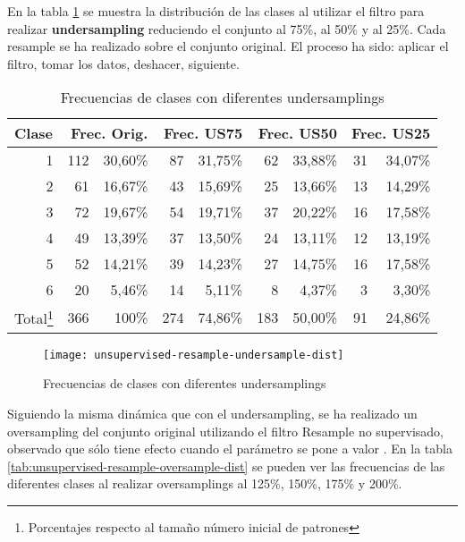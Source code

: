 En la tabla \ref{tab:unsupervised-resample-undersample-dist} se muestra la distribución de las clases al utilizar el filtro para realizar \textbf{undersampling} reduciendo el conjunto al 75\%, al 50\% y al 25\%. Cada resample se ha realizado sobre el conjunto original. El proceso ha sido: aplicar el filtro, tomar los datos, deshacer, siguiente.
\begin{table}[ht]
    \centering
    \begin{tabular}{|r|rr|rr|rr|rr|}
        \hline
        \multicolumn{1}{|l|}{Clase} & \multicolumn{2}{r|}{Frec. Orig.} & \multicolumn{2}{r|}{Frec. US75} & \multicolumn{2}{r|}{Frec. US50} & \multicolumn{2}{r|}{Frec. US25} \\ 
        \hline
        1 & 112 & 30,60\% & 87 & 31,75\% & 62 & 33,88\% & 31 & 34,07\% \\
        2 & 61  & 16,67\% & 43 & 15,69\% & 25 & 13,66\% & 13 & 14,29\% \\
        3 & 72  & 19,67\% & 54 & 19,71\% & 37 & 20,22\% & 16 & 17,58\% \\
        4 & 49  & 13,39\% & 37 & 13,50\% & 24 & 13,11\% & 12 & 13,19\% \\
        5 & 52  & 14,21\% & 39 & 14,23\% & 27 & 14,75\% & 16 & 17,58\% \\
        6 & 20  & 5,46\%  & 14 & 5,11\%  & 8  & 4,37\%  & 3  & 3,30\%  \\
        \hline 
        Total\footnote{Porcentajes respecto al tamaño número inicial de patrones} & 366 & 100\% & 274 & 74,86\% & 183 & 50,00\% & 91 & 24,86\% \\
        \hline
    \end{tabular}
    \caption{Frecuencias de clases con diferentes undersamplings}
    \label{tab:unsupervised-resample-undersample-dist}
\end{table}
\begin{figure}[ht]
    \centering
    \texttt{[image: unsupervised-resample-undersample-dist]}
    \caption{Frecuencias de clases con diferentes undersamplings}
    \label{fig:unsupervised-resample-undersample-dist}
\end{figure}

Siguiendo la misma dinámica que con el undersampling, se ha realizado un oversampling del conjunto original utilizando el filtro Resample no supervisado, observado que sólo tiene efecto cuando el parámetro  se pone a valor . En la tabla \ref{tab:unsupervised-resample-oversample-dist} se pueden ver las frecuencias de las diferentes clases al realizar oversamplings al 125\%, 150\%, 175\% y 200\%.


